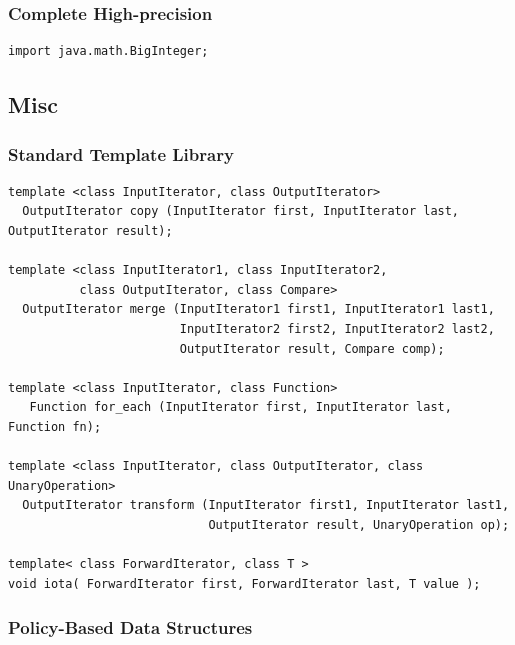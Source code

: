 \documentclass[twoside]{article}
\begin{document}
\subsubsection{Complete High-precision}
\begin{lstlisting}
import java.math.BigInteger;
\end{lstlisting}

\subsection{Misc}
\subsubsection{Standard Template Library}
\begin{lstlisting}
template <class InputIterator, class OutputIterator>
  OutputIterator copy (InputIterator first, InputIterator last, OutputIterator result);

template <class InputIterator1, class InputIterator2,
          class OutputIterator, class Compare>
  OutputIterator merge (InputIterator1 first1, InputIterator1 last1,
                        InputIterator2 first2, InputIterator2 last2,
                        OutputIterator result, Compare comp);

template <class InputIterator, class Function>
   Function for_each (InputIterator first, InputIterator last, Function fn);

template <class InputIterator, class OutputIterator, class UnaryOperation>
  OutputIterator transform (InputIterator first1, InputIterator last1,
                            OutputIterator result, UnaryOperation op);

template< class ForwardIterator, class T >
void iota( ForwardIterator first, ForwardIterator last, T value );

\end{lstlisting}
\subsubsection{Policy-Based Data Structures}
\end{document}
